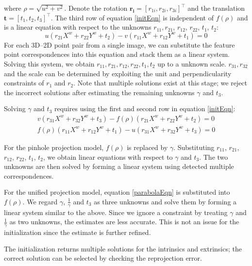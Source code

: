 \documentclass{report}
\begin{document}
where $\rho = \sqrt{u^2 + v^2}$. Denote the rotation $\mathbf{r_i} = [r_{1i}, r_{2i}, r_{3i}]^\top$ and the translation $\mathbf{t} = [t_1, t_2, t_3]^\top$. The third row of equation \ref{initEqn} is independent of $f(\rho)$ and is a linear equation with respect to the unknowns $r_{11}, r_{21}$, $r_{12}$, $r_{22}$, $t_1$, $t_2$:
\begin{equation}
u (r_{21} X^w + r_{22} Y^w + t_2) - v (r_{11} X^w + r_{12} Y^w + t_1) = 0
\end{equation}
For each 3D--2D point pair from a single image, we can substitute the feature point correspondences into this equation and stack them as a linear system. Solving this system, we obtain $r_{11}, r_{21}, r_{12}, r_{22}, t_1, t_2$ up to a unknown scale. $r_{31}, r_{32}$ and the scale can be determined by exploiting the unit and perpendicularity constraints of $r_1$ and $r_2$. Note that multiple solutions exist at this stage; we reject the incorrect solutions after estimating the remaining unknowns $\gamma$ and $t_3$. 

Solving $\gamma$ and $t_3$ requires using the first and second row in equation \ref{initEqn}:
\begin{eqnarray}
v (r_{31} X^w + r_{32} Y^w + t_3) - f(\rho) (r_{21} X^w + r_{22} Y^w + t_2) = 0 \\ 
f(\rho) (r_{11} X^w + r_{12} Y^w + t_1) - u (r_{31} X^w + r_{32} Y^w + t_3) = 0
\end{eqnarray}

For the pinhole projection model, $f(\rho)$ is replaced by $\gamma$. Substituting $r_{11}$, $r_{21}$, $r_{12}$, $r_{22}$, $t_1$, $t_2$, we obtain linear equations with respect to $\gamma$ and $t_3$. The two unknowns are then solved by forming a linear system using detected multiple correspondences. 

For the unified projection model, equation \ref{parabolaEqn} is substituted into $f(\rho)$. We regard $\gamma$, $\frac{1}{\gamma}$ and $t_3$ as three unknowns and solve them by forming a linear system similar to the above. Since we ignore a constraint by treating $\gamma$ and $\frac{1}{\gamma}$ as two unknowns, the estimates are less accurate. This is not an issue for the initialization since the estimate is further refined. 

The initialization returns multiple solutions for the intrinsics and extrinsics; the correct solution can be selected by checking the reprojection error. 
\end{document}
